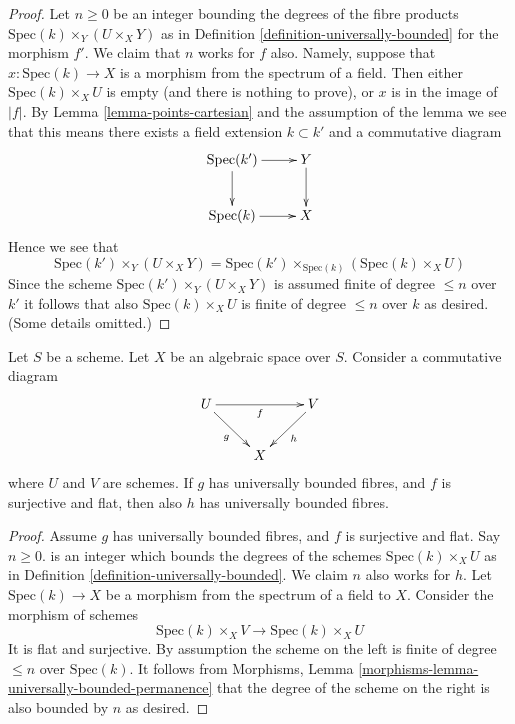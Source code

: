 \begin{proof}
Let $n \geq 0$ be an integer bounding the degrees of the fibre
products $\text{Spec}(k) \times_Y (U \times_X Y)$ as in
Definition \ref{definition-universally-bounded} for the morphism $f'$.
We claim that $n$ works for $f$ also. Namely, suppose that
$x : \text{Spec}(k) \to X$ is a morphism from the spectrum of
a field. Then either $\text{Spec}(k) \times_X U$ is empty (and there
is nothing to prove), or $x$ is in the image of $|f|$. By
Lemma \ref{lemma-points-cartesian} and the assumption of the lemma we see
that this means there exists a field extension $k \subset k'$ and a
commutative diagram
$$
\xymatrix{
\text{Spec}(k') \ar[r] \ar[d] & Y \ar[d] \\
\text{Spec}(k) \ar[r] & X
}
$$
Hence we see that
$$
\text{Spec}(k') \times_Y (U \times_X Y) =
\text{Spec}(k') \times_{\text{Spec}(k)} (\text{Spec}(k) \times_X U)
$$
Since the scheme $\text{Spec}(k') \times_Y (U \times_X Y)$ is assumed finite
of degree $\leq n$ over $k'$ it follows that also $\text{Spec}(k) \times_X U$
is finite of degree $\leq n$ over $k$ as desired. (Some details omitted.)
\end{proof}

\begin{lemma}
\label{lemma-universally-bounded-permanence}
Let $S$ be a scheme. Let $X$ be an algebraic space over $S$.
Consider a commutative diagram
$$
\xymatrix{
U \ar[rd]_g \ar[rr]_{f} & & V \ar[ld]^h \\
& X &
}
$$
where $U$ and $V$ are schemes. If $g$ has universally bounded fibres,
and $f$ is surjective and flat, then also $h$ has universally bounded fibres.
\end{lemma}

\begin{proof}
Assume $g$ has universally bounded fibres, and $f$ is surjective and flat.
Say $n \geq 0$. is an integer which bounds the degrees of the schemes
$\text{Spec}(k) \times_X U$ as in
Definition \ref{definition-universally-bounded}.
We claim $n$ also works for $h$.
Let $\text{Spec}(k) \to X$ be a morphism from the spectrum of a
field to $X$. Consider the morphism of schemes
$$
\text{Spec}(k) \times_X V \longrightarrow \text{Spec}(k) \times_X U
$$
It is flat and surjective. By assumption the scheme
on the left is finite of degree $\leq n$ over $\text{Spec}(k)$.
It follows from
Morphisms, Lemma \ref{morphisms-lemma-universally-bounded-permanence}
that the degree of the scheme on the right is also bounded by $n$
as desired.
\end{proof}

